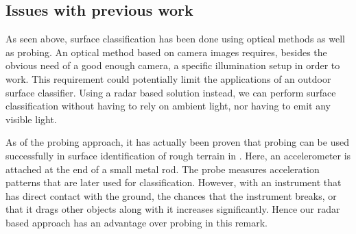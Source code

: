 \iffalse
 of urban environments and automotive radar 
\\ \\
Applications involving millimetre-wave radars and surface recognition is scarce.  
\\ \\
These radars commonly have wavelenghts of something something
\\ \\
If we however want to classify surface materials using a much shorter wavelength, the task changes dramatically as apsorption is near-instant. 
\\ \\
Something about radar wavelenght categories
\\ \\
Furthermore, radar sensors are commonly used in an array setting which permits beamforming and extraction of spatial information. 
\\ \\
If one on the other hand only has a singular radar sensor this is not possible and you must resort to other means.
\\ \\
Probably want something about IQ demodulation somewhere in here.
\fi
\subsection{Issues with previous work}
As seen above, surface classification has been done using optical methods as well as probing. An optical method based on camera images requires, besides the obvious need of a good enough camera, a specific illumination setup in order to work. This requirement could potentially limit the applications of an outdoor surface classifier. Using a radar based solution instead, we can perform surface classification without having to rely on ambient light, nor having to emit any visible light.

As of the probing approach, it has actually been proven that probing can be used successfully in surface identification of rough terrain in \citep{giguere_dudek_2011}. Here, an accelerometer is attached at the end of a small metal rod. The probe measures acceleration patterns that are later used for classification. However, with an instrument that has direct contact with the ground, the chances that the instrument breaks, or that it drags other objects along with it increases significantly. Hence our radar based approach has an advantage over probing in this remark.

